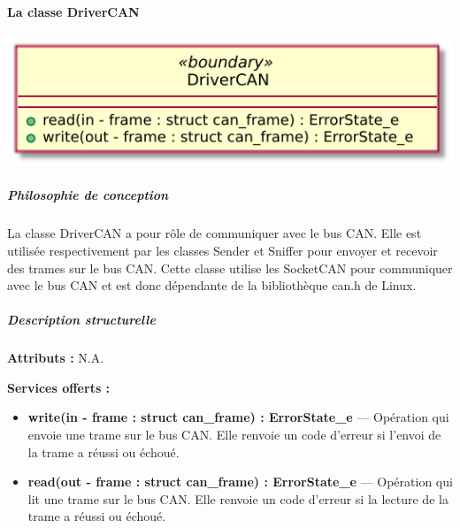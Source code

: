 \paragraph{La classe DriverCAN}

\begin{minipage}
    {\linewidth}
    \centering
    \includegraphics[width=0.50\linewidth]{../schemas/Conception_detaillee/classe_driverCAN.pdf}
\end{minipage}

\subparagraph{Philosophie de conception \newline}

\medspace

La classe DriverCAN a pour rôle de communiquer avec le bus CAN. Elle est utilisée respectivement par les classes Sender et Sniffer pour envoyer et recevoir des trames sur le bus CAN. Cette classe utilise les SocketCAN pour communiquer avec le bus CAN et est donc dépendante de la bibliothèque can.h de Linux. 

\subparagraph{Description structurelle \newline}

\medspace

\textbf{Attributs :}
N.A.

\textbf{Services offerts :}

\begin{itemize}
    \item \textbf{write(in - frame : struct can\_frame) : ErrorState\_e} --- Opération qui envoie une trame sur le bus CAN. Elle renvoie un code d'erreur si l'envoi de la trame a réussi ou échoué.
    \item \textbf{read(out - frame : struct can\_frame) : ErrorState\_e} --- Opération qui lit une trame sur le bus CAN. Elle renvoie un code d'erreur si la lecture de la trame a réussi ou échoué.
\end{itemize}